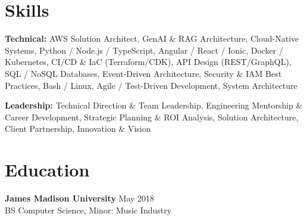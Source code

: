 \documentclass[11pt,letterpaper]{article}
\begin{document}
\section{Skills}

\vspace{2pt}

\noindent\textbf{\textcolor{primary}{Technical:}} \textcolor{darktext}{AWS Solution Architect, GenAI \& RAG Architecture, Cloud-Native Systems, Python / Node.js / TypeScript, Angular / React / Ionic, Docker / Kubernetes, CI/CD \& IaC (Terraform/CDK), API Design (REST/GraphQL), SQL / NoSQL Databases, Event-Driven Architecture, Security \& IAM Best Practices, Bash / Linux, Agile / Test-Driven Development, System Architecture}

\vspace{6pt}

\noindent\textbf{\textcolor{primary}{Leadership:}} \textcolor{darktext}{Technical Direction \& Team Leadership, Engineering Mentorship \& Career Development, Strategic Planning \& ROI Analysis, Solution Architecture, Client Partnership, Innovation \& Vision}

\section{Education}

\noindent\textbf{\textcolor{primary}{James Madison University}} \hfill \textcolor{lighttext}{May 2018}\\
\textcolor{darktext}{BS Computer Science, Minor: Music Industry}
\end{document}

